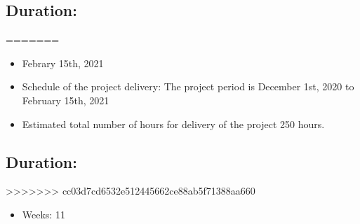 \documentclass{article}
\begin{document}
\subsection{Duration:}
\label{sec:org921cd62}
=======
\label{sec:orgb8a0f65}
\begin{itemize}
\item Febrary 15th, 2021
\end{itemize}

\begin{itemize}
\item Schedule of the project delivery: The project period is December 1st, 2020 to February 15th, 2021
\item Estimated total number of hours for delivery of the project 250 hours.
\end{itemize}
\subsection{Duration:}
\label{sec:org74989cf}
>>>>>>> cc03d7cd6532e512445662ce88ab5f71388aa660
\begin{itemize}
\item Weeks: 11
\end{itemize}
\end{document}
